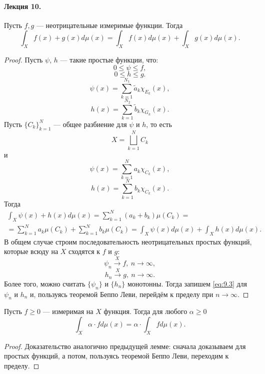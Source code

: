 \paragraph{Лекция 10.}
\begin{lemma}[Аддитивность]
    Пусть $f,g$ — неотрицательные измеримые функции.
    Тогда
    \[\int_X f(x) + g(x) d\mu(x)
    =
    \int_X f(x) d\mu(x) + \int_X g(x)d\mu(x).\]
\end{lemma} 
\begin{proof}
    Пусть $\psi$, $h$ — такие простые функции, что:
    \[0 \leqslant \psi \leqslant f,\]
    \[0 \leqslant h \leqslant g.\]
    \[\psi(x) = \sum\limits_{k=1}^{N_1} \widetilde{a}_k \chi_{E_k}(x),\]
    \[h(x) = \sum\limits_{k=1}^{N_2} \widetilde{b}_k \chi_{G_k}(x).\]
    Пусть $\{C_k\}_{k=1}^N$ — общее разбиение для $\psi$ и $h$, то есть 
    \[X = \bigsqcup\limits_{k=1}^{N}C_k\]
    и
    \[\psi(x) = \sum\limits_{k=1}^{N}a_k \chi_{C_k}(x),\]
    \[h(x) = \sum\limits_{k=1}^{N}b_k \chi_{C_k}(x).\]
    Тогда
    \begin{multline}
        \int_X \psi(x) + h(x) d\mu(x)
        = \sum\limits_{k=1}^{N}(a_k+b_k) \mu(C_k)
        =\\= \sum\limits_{k=1}^{N}a_k\mu(C_k) + \sum\limits_{k=1}^{N}b_k \mu(C_k)
        = \int_X \psi(x) d\mu(x) + \int_X h(x) d\mu(x). \label{eq:9.3}
    \end{multline} 
    В общем случае строим последовательность неотрицательных простых функций, которые всюду на $X$ сходятся к $f$ и $g$:
    \[\psi_n \xrightarrow{X} f, \ n \to \infty,\]
    \[h_n \xrightarrow{X} g, \ n \to \infty.\]
    Более того, можно считать $\{\psi_n\}$ и $\{h_n\}$ монотонны.
    Тогда запишем \eqref{eq:9.3} для $\psi_n$ и $h_n$ и, пользуясь теоремой Беппо Леви, перейдём к пределу при $n\to \infty$.
\end{proof} 

\begin{lemma}
    Пусть $f \geqslant 0$ — измеримая на $X$ функция.
    Тогда для любого $\alpha \geqslant 0$
    \[\int_X \alpha \cdot f d\mu(x) = \alpha \cdot \int_X f d\mu(x).\]
\end{lemma} 
\begin{proof}
    Доказательство аналогично предыдущей лемме: сначала доказываем для простых функций, а потом, пользуясь теоремой Беппо Леви, переходим к пределу.
\end{proof} 

